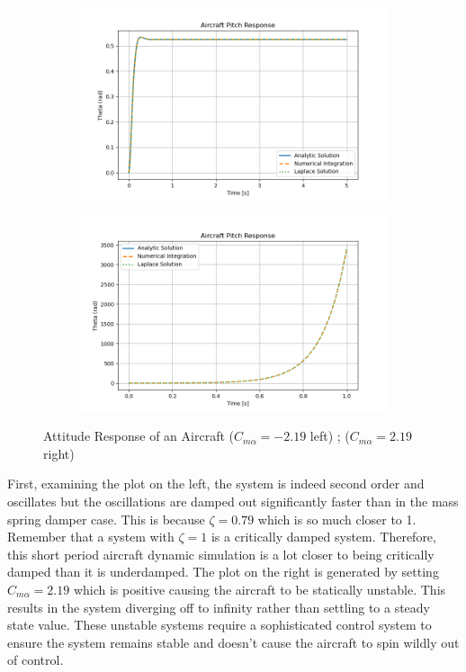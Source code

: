 \begin{figure}[H]
\centering
\begin{subfigure}[b]{0.48\textwidth}
\centering
\includegraphics[width=\linewidth]{Figures/aircraft_response_stable.png}
\end{subfigure}
\hfill
\begin{subfigure}[b]{0.48\textwidth}
\centering
\includegraphics[width=\linewidth]{Figures/aircraft_response_unstable.png}
\end{subfigure}
\caption{Attitude Response of an Aircraft ($C_{m\alpha}=-2.19$ left) ; ($C_{m\alpha}=2.19$ right)}
\label{f:aircraft_response}
\end{figure}
First, examining the plot on the left, the system is indeed second order and oscillates but the oscillations are damped out significantly faster than in the mass spring damper case. This is because $\zeta = 0.79$ which is so much closer to 1. Remember that a system with $\zeta=1$ is a critically damped system. Therefore, this short period aircraft dynamic simulation is a lot closer to being critically damped than it is underdamped. The plot on the right is generated by setting $C_{m\alpha}=2.19$ which is positive causing the aircraft to be statically unstable. This results in the system diverging off to infinity rather than settling to a steady state value. These unstable systems require a sophisticated control system to ensure the system remains stable and doesn't cause the aircraft to spin wildly out of control.

